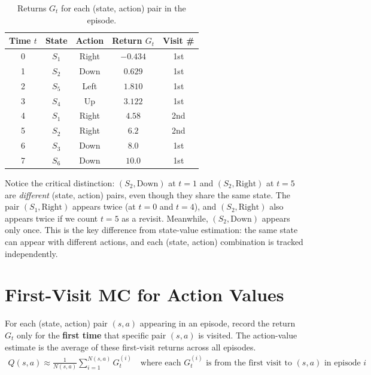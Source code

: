 \documentclass[journal, onecolumn]{IEEEtran}
\newcommand{\vocab}[1]{\textbf{\textcolor{Garnet}{#1}}}
\begin{document}
\begin{table}[H]
\centering
\caption{Returns $G_t$ for each (state, action) pair in the episode.}
\label{tab:returns_actions}
\begin{tabular}{ccccc}
\toprule
\textbf{Time $t$} & \textbf{State} & \textbf{Action} & \textbf{Return $G_t$} & \textbf{Visit \#} \\
\midrule
0 & $S_1$ & Right  & $-0.434$ & 1st \\
1 & $S_2$ & Down   & $0.629$  & 1st \\
2 & $S_5$ & Left   & $1.810$  & 1st \\
3 & $S_4$ & Up     & $3.122$  & 1st \\
4 & \textcolor{Rose}{$S_1$} & \textcolor{Rose}{Right}  & \textcolor{Rose}{$4.58$}   & \textcolor{Rose}{2nd} \\
5 & \textcolor{Rose}{$S_2$} & \textcolor{Rose}{Right}  & \textcolor{Rose}{$6.2$}    & \textcolor{Rose}{2nd} \\
6 & $S_3$ & Down   & $8.0$    & 1st \\
7 & $S_6$ & Down   & $10.0$   & 1st \\
\bottomrule
\end{tabular}
\end{table}

Notice the critical distinction: $(S_2, \text{Down})$ at $t=1$ and $(S_2, \text{Right})$ at $t=5$ are \textit{different} (state, action) pairs, even though they share the same state. The pair $(S_1, \text{Right})$ appears twice (at $t=0$ and $t=4$), and $(S_2, \text{Right})$ also appears twice if we count $t=5$ as a revisit. Meanwhile, $(S_2, \text{Down})$ appears only once. This is the key difference from state-value estimation: the same state can appear with different actions, and each (state, action) combination is tracked independently.

\section{First-Visit MC for Action Values}

\begin{tcolorbox}[memorybox={Definition: First-Visit MC for $Q(s,a)$}]
For each (state, action) pair $(s,a)$ appearing in an episode, record the return $G_t$ only for the \vocab{first time} that specific pair $(s,a)$ is visited. The action-value estimate is the average of these first-visit returns across all episodes.
\begin{align}
    Q(s,a) \approx \frac{1}{N(s,a)} \sum_{i=1}^{N(s,a)} G_t^{(i)} \quad \text{where each } G_t^{(i)} \text{ is from the first visit to } (s,a) \text{ in episode } i
\end{align}
\end{tcolorbox}
\end{document}
